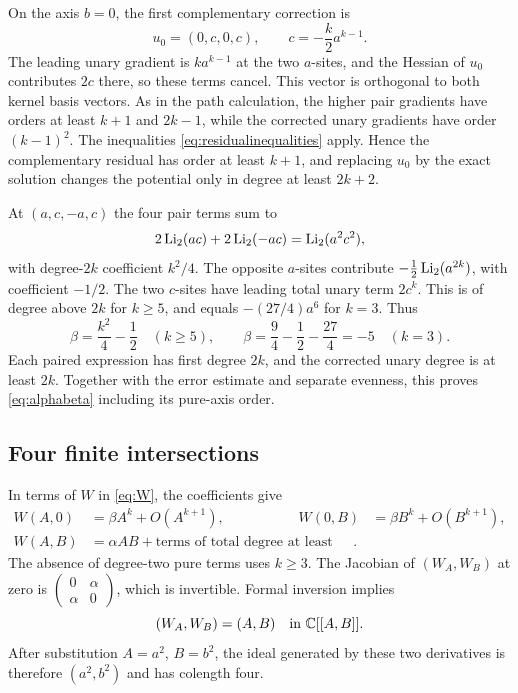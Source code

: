 On the axis $b=0$, the first complementary correction is
\begin{equation}\label{eq:cycleaxis}
 u_0=(0,c,0,c),\qquad c=-\frac{k}{2}a^{k-1}.
\end{equation}
The leading unary gradient is $k a^{k-1}$ at the two $a$-sites,
and the Hessian of $u_0$ contributes $2c$ there, so these terms cancel.
This vector is orthogonal to both kernel basis vectors. As in the path
calculation, the higher pair gradients have orders at least $k+1$ and
$2k-1$, while the corrected unary gradients have order $(k-1)^2$.
The inequalities \eqref{eq:residualinequalities} apply. Hence the
complementary residual has order at least $k+1$, and replacing $u_0$ by
the exact solution changes the potential only in degree at least $2k+2$.

At $(a,c,-a,c)$ the four pair terms sum to
\[
 2\operatorname{Li}_2(ac)+2\operatorname{Li}_2(-ac)=\operatorname{Li}_2(a^2c^2),
\]
with degree-$2k$ coefficient $k^2/4$. The opposite $a$-sites contribute
$-\tfrac12\operatorname{Li}_2(a^{2k})$, with coefficient $-1/2$.
The two $c$-sites have leading total unary term $2c^k$. This is of
degree above $2k$ for $k\geq5$, and equals $-(27/4)a^6$ for $k=3$.
Thus
\[
 \beta=\frac{k^2}4-\frac12\quad(k\geq5),\qquad
 \beta=\frac94-\frac12-\frac{27}4=-5\quad(k=3).
\]
Each paired expression has first degree $2k$, and the corrected unary
degree is at least $2k$. Together with the error estimate and separate
evenness, this proves \eqref{eq:alphabeta} including its pure-axis order.

\subsection{Four finite intersections}

In terms of $W$ in \eqref{eq:W}, the coefficients give
\begin{equation}\label{eq:Waxes}
 \begin{aligned}
 W(A,0)&=\beta A^k+O(A^{k+1}),&
 W(0,B)&=\beta B^k+O(B^{k+1}),\\
 W(A,B)&=\alpha AB+\text{terms of total degree at least three}.
 \end{aligned}
\end{equation}
The absence of degree-two pure terms uses $k\geq3$.
The Jacobian of $(W_A,W_B)$ at zero is
$\left(\begin{smallmatrix}0&\alpha\\\alpha&0\end{smallmatrix}\right)$,
which is invertible. Formal inversion implies
\[
 (W_A,W_B)=(A,B)\quad\text{in }\mathbb C[[A,B]].
\]
After substitution $A=a^2$, $B=b^2$, the ideal generated by these two
derivatives is therefore $(a^2,b^2)$ and has colength four.

